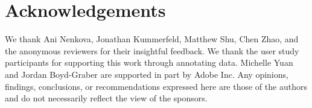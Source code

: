 \section*{Acknowledgements}

We thank Ani Nenkova, Jonathan Kummerfeld, Matthew Shu, Chen Zhao, and the anonymous reviewers for their insightful feedback.
We thank the user study participants for supporting this work through annotating
data.
Michelle Yuan and Jordan Boyd-Graber are supported in part by Adobe Inc.
Any opinions, findings, conclusions, or recommendations
expressed here are those of the authors and do not necessarily reflect the view of the sponsors.

